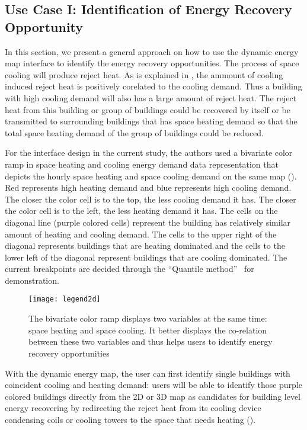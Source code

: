\subsection{Use Case I: Identification of Energy Recovery Opportunity}
In this section, we present a general approach on how to use the
dynamic energy map interface to identify the energy recovery
opportunities. The process of space cooling will produce reject
heat. As is explained in , the ammount of
cooling induced reject heat is positively corelated to the cooling
demand. Thus a building with high cooling demand will also has a large
amount of reject heat. The reject heat from this building or group of
buildings could be recovered by itself or be transmitted to
surrounding buildings that has space heating demand so that the total
space heating demand of the group of buildings could be reduced.

For the interface design in the current study, the authors used a
bivariate color ramp in space heating and cooling energy demand data
representation that depicts the hourly space heating and space cooling
demand on the same map (). Red represents high
heating demand and blue represents high cooling demand. The closer the
color cell is to the top, the less cooling demand it has. The closer
the color cell is to the left, the less heating demand it has. The
cells on the diagonal line (purple colored cells) represent the
building has relatively similar amount of heating and cooling
demand. The cells to the upper right of the diagonal represents
buildings that are heating dominated and the cells to the lower left
of the diagonal represent buildings that are cooling dominated. The
current breakpoints are decided through the ``Quantile
method''~\cite{GIS_Jenks2014} for demonstration.

\begin{figure}[h!]
  \centering
  \texttt{[image: legend2d]}
  \caption[Bi-Variate Color Ramp]{The bivariate color ramp displays
    two variables at the same time: space heating and space
    cooling. It better displays the co-relation between these two
    variables and thus helps users to identify energy recovery
    opportunities}
  \label{fig:legend2d}
\end{figure}

With the dynamic energy map, the user can first identify single
buildings with coincident cooling and heating demand: users will be
able to identify those purple colored buildings directly from the 2D
or 3D map as candidates for building level energy recovering by
redirecting the reject heat from its cooling device condensing coils
or cooling towers to the space that needs heating
().

